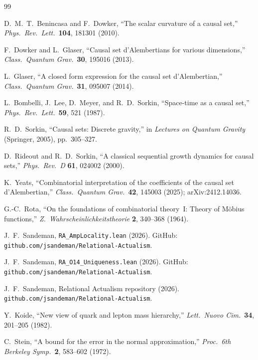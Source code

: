 \documentclass[12pt,a4paper]{article}
\begin{document}
\begin{thebibliography}{99}

 D.~M.~T.~Benincasa and F.~Dowker, ``The scalar curvature of a causal set,'' \emph{Phys.\ Rev.\ Lett.}\ \textbf{104}, 181301 (2010).

 F.~Dowker and L.~Glaser, ``Causal set d'Alembertians for various dimensions,'' \emph{Class.\ Quantum Grav.}\ \textbf{30}, 195016 (2013).

 L.~Glaser, ``A closed form expression for the causal set d'Alembertian,'' \emph{Class.\ Quantum Grav.}\ \textbf{31}, 095007 (2014).

 L.~Bombelli, J.~Lee, D.~Meyer, and R.~D.~Sorkin, ``Space-time as a causal set,'' \emph{Phys.\ Rev.\ Lett.}\ \textbf{59}, 521 (1987).

 R.~D.~Sorkin, ``Causal sets: Discrete gravity,'' in \emph{Lectures on Quantum Gravity} (Springer, 2005), pp.~305--327.

 D.~Rideout and R.~D.~Sorkin, ``A classical sequential growth dynamics for causal sets,'' \emph{Phys.\ Rev.\ D} \textbf{61}, 024002 (2000).

 K.~Yeats, ``Combinatorial interpretation of the coefficients of the causal set d'Alembertian,'' \emph{Class.\ Quantum Grav.}\ \textbf{42}, 145003 (2025); arXiv:2412.14036.

 G.-C.~Rota, ``On the foundations of combinatorial theory~I: Theory of M\"obius functions,'' \emph{Z.\ Wahrscheinlichkeitstheorie} \textbf{2}, 340--368 (1964).

 J.~F.~Sandeman, \texttt{RA\_AmpLocality.lean} (2026). GitHub: \texttt{github.com/jsandeman/Relational-Actualism}.

 J.~F.~Sandeman, \texttt{RA\_O14\_Uniqueness.lean} (2026). GitHub: \texttt{github.com/jsandeman/Relational-Actualism}.

 J.~F.~Sandeman, Relational Actualism repository (2026). \texttt{github.com/jsandeman/Relational-Actualism}.

 Y.~Koide, ``New view of quark and lepton mass hierarchy,'' \emph{Lett.\ Nuovo Cim.}\ \textbf{34}, 201--205 (1982).

 C.~Stein, ``A bound for the error in the normal approximation,'' \emph{Proc.\ 6th Berkeley Symp.}\ \textbf{2}, 583--602 (1972).


\end{thebibliography}
\end{document}
